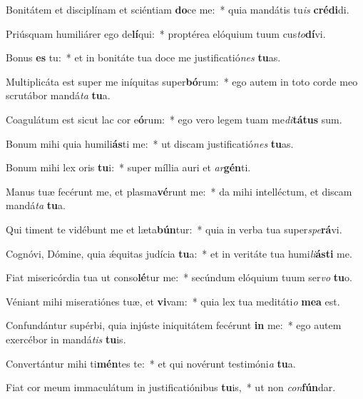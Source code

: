 \item Bonitátem et disciplínam et sciéntiam \textbf{do}ce me:~* quia mandátis tu\textit{is} \textbf{cré}\textbf{di}di.
\item Priúsquam humiliárer ego de\textbf{lí}qui:~* proptérea elóquium tuum cus\textit{to}\textbf{dí}vi.
\item Bonus \textbf{es} tu:~* et in bonitáte tua doce me justificatió\textit{nes} \textbf{tu}as.
\item Multiplicáta est super me iníquitas super\textbf{bó}rum:~* ego autem in toto corde meo scrutábor mandá\textit{ta} \textbf{tu}a.
\item Coagulátum est sicut lac cor e\textbf{ó}rum:~* ego vero legem tuam me\textit{di}\textbf{tá}\textbf{tus} sum.
\item Bonum mihi quia humili\textbf{ás}ti me:~* ut discam justificatió\textit{nes} \textbf{tu}as.
\item Bonum mihi lex oris \textbf{tu}i:~* super míllia auri et \textit{ar}\textbf{gén}ti.
\item Manus tuæ fecérunt me, et plasma\textbf{vé}runt me:~* da mihi intelléctum, et discam mandá\textit{ta} \textbf{tu}a.
\item Qui timent te vidébunt me et læta\textbf{bún}tur:~* quia in verba tua super\textit{spe}\textbf{rá}vi.
\item Cognóvi, Dómine, quia ǽquitas judícia \textbf{tu}a:~* et in veritáte tua humi\textit{li}\textbf{ás}\textbf{ti} me.
\item Fiat misericórdia tua ut conso\textbf{lé}tur me:~* secúndum elóquium tuum ser\textit{vo} \textbf{tu}o.
\item Véniant mihi miseratiónes tuæ, et \textbf{vi}vam:~* quia lex tua meditáti\textit{o} \textbf{me}\textbf{a} est.
\item Confundántur supérbi, quia injúste iniquitátem fecérunt \textbf{in} me:~* ego autem exercébor in mandá\textit{tis} \textbf{tu}is.
\item Convertántur mihi ti\textbf{mén}tes te:~* et qui novérunt testimóni\textit{a} \textbf{tu}a.
\item Fiat cor meum immaculátum in justificatiónibus \textbf{tu}is,~* ut non \textit{con}\textbf{fún}dar.
